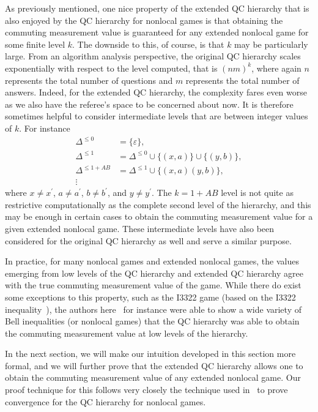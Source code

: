 As previously mentioned, one nice property of the extended QC hierarchy that is also enjoyed by the QC hierarchy for nonlocal games is that obtaining the commuting measurement value is guaranteed for any extended nonlocal game for some finite level $k$. The downside to this, of course, is that $k$ may be particularly large. From an algorithm analysis perspective, the original QC hierarchy scales exponentially with respect to the level computed, that is $(nm)^k$, where again $n$ represents the total number of questions and $m$ represents the total number of answers. Indeed, for the extended QC hierarchy, the complexity fares even worse as we also have the referee's space to be concerned about now. It is therefore sometimes helpful to consider intermediate levels that are between integer values of $k$. For instance
\begin{equation}
	\begin{aligned}
		\Delta^{\leq 0} &= \{ \varepsilon \}, \\
		\Delta^{\leq 1} &= \Delta^{\leq 0} \cup \{ (x,a) \} \cup \{ (y,b) \}, \\
		\Delta^{\leq 1+AB} &= \Delta^{\leq 1} \cup \{ (x,a)(y,b) \}, \\
		\vdots
	\end{aligned}
\end{equation}
where $x \not= x^{\prime}$, $a \not= a^{\prime}$, $b \not= b^{\prime}$, and $y \not= y^{\prime}$. The $k = 1 + AB$ level is not quite as restrictive computationally as the complete second level of the hierarchy, and this may be enough in certain cases to obtain the commuting measurement value for a given extended nonlocal game. These intermediate levels have also been considered for the original QC hierarchy as well and serve a similar purpose. 

In practice, for many nonlocal games and extended nonlocal games, the values emerging from low levels of the QC hierarchy and extended QC hierarchy agree with the true commuting measurement value of the game. While there do exist some exceptions to this property, such as the I3322 game (based on the I3322 inequality~\cite{Collins2004}), the authors here~\cite{Pal2009} for instance were able to show a wide variety of Bell inequalities (or nonlocal games) that the QC hierarchy was able to obtain the commuting measurement value at low levels of the hierarchy.
 
In the next section, we will make our intuition developed in this section more formal, and we will further prove that the extended QC hierarchy allows one to obtain the commuting measurement value of any extended nonlocal game. Our proof technique for this follows very closely the technique used in~\cite{Navascues2007, Navascues2008} to prove convergence for the QC hierarchy for nonlocal games.


